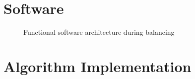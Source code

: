 
\section{Software}

\begin{figure}
    \centering
    
    \caption{Functional software architecture during balancing}
    \label{fig:software_flowchart}
\end{figure}




\section{Algorithm Implementation}



